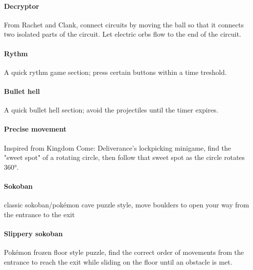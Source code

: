 
\paragraph{Decryptor} From Rachet and Clank, connect circuits by moving the ball so that it connects two isolated parts of the circuit. Let electric orbs flow to the end of the circuit.


\paragraph{Rythm} A quick rythm game section; press certain buttons within a time treshold.

\paragraph{Bullet hell} A quick bullet hell section; avoid the projectiles until the timer expires. 

\paragraph{Precise movement} Inspired from Kingdom Come: Deliverance's lockpicking minigame, find the "sweet spot" of a rotating circle, then follow that sweet spot as the circle rotates 360°.


\paragraph{Sokoban} classic sokoban/pokémon cave puzzle style, move boulders to open your way from the entrance to the exit


\paragraph{Slippery sokoban} Pokémon frozen floor style puzzle, find the correct order of movements from the entrance to reach the exit while sliding on the floor until an obstacle is met.


